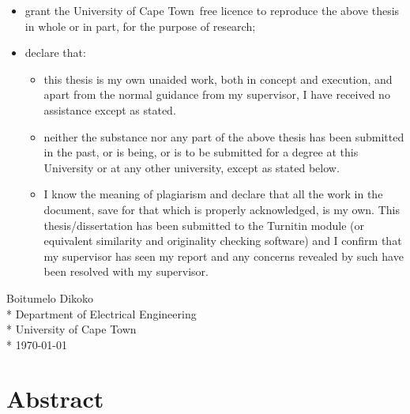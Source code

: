 \documentclass[a4paper, 12pt, oneside, openright, parskip=full]{book}
\newcommand{\auth}{Boitumelo Dikoko}								%
\newcommand{\dept}{Department of Electrical Engineering}%
\newcommand{\uni}{University of Cape Town}				%
\newcommand*{\signature}[1]
{
	\par\noindent\makebox [5cm]{\hrulefill}
	\par\noindent\makebox [5cm][1]{#1}
}
\begin{document}
\begin{itemize}
	\item		grant the \uni\  free licence to reproduce the above thesis in whole or in part, for the purpose of research;
	\item		declare that:
	
	\begin{itemize}
		\item		this thesis is my own unaided work, both in concept and execution, and apart from the normal guidance from my supervisor, I have received no assistance except as stated.
		\item		neither the substance nor any part of the above thesis has been submitted in the past, or is being, or is to be submitted for a degree at this University or at any other university, except as stated below.
		\item      I know the meaning of plagiarism and declare that all the work in the document, save for that which is properly acknowledged, is my own. This thesis/dissertation has been submitted to the Turnitin module (or  equivalent similarity and originality checking software) and I confirm that my supervisor has seen my report and any concerns revealed by such have been resolved with my supervisor.
	\end{itemize}	
\end{itemize}

\begin{flushright}	%
	\vskip 6cm
	\noindent \signature{x}
	\noindent \auth \\*
	\vskip 2mm
	\noindent \dept \\*
	\noindent \uni \\*
	\vskip 2mm
	\noindent \today
\end{flushright}

\chapter{Abstract}				
\label{ch:abs}

\end{document}
